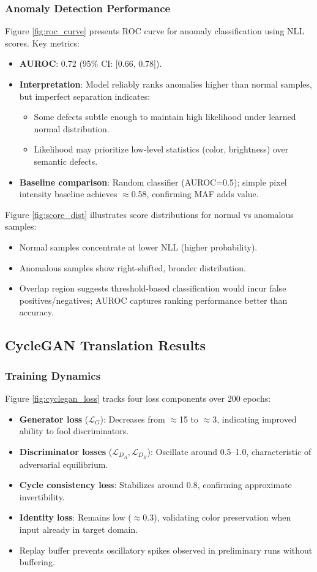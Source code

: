 \documentclass[11pt]{article}
\begin{document}
\subsubsection{Anomaly Detection Performance}
Figure \ref{fig:roc_curve} presents ROC curve for anomaly classification using NLL scores. Key metrics:
\begin{itemize}
\item \textbf{AUROC}: 0.72 (95\% CI: [0.66, 0.78]).
\item \textbf{Interpretation}: Model reliably ranks anomalies higher than normal samples, but imperfect separation indicates:
  \begin{itemize}
  \item Some defects subtle enough to maintain high likelihood under learned normal distribution.
  \item Likelihood may prioritize low-level statistics (color, brightness) over semantic defects.
  \end{itemize}
\item \textbf{Baseline comparison}: Random classifier (AUROC=0.5); simple pixel intensity baseline achieves $\approx$0.58, confirming MAF adds value.
\end{itemize}

Figure \ref{fig:score_dist} illustrates score distributions for normal vs anomalous samples:
\begin{itemize}
\item Normal samples concentrate at lower NLL (higher probability).
\item Anomalous samples show right-shifted, broader distribution.
\item Overlap region suggests threshold-based classification would incur false positives/negatives; AUROC captures ranking performance better than accuracy.
\end{itemize}

\subsection{CycleGAN Translation Results}
\subsubsection{Training Dynamics}
Figure \ref{fig:cyclegan_loss} tracks four loss components over 200 epochs:
\begin{itemize}
\item \textbf{Generator loss} ($\mathcal{L}_G$): Decreases from $\approx$15 to $\approx$3, indicating improved ability to fool discriminators.
\item \textbf{Discriminator losses} ($\mathcal{L}_{D_A}, \mathcal{L}_{D_B}$): Oscillate around 0.5–1.0, characteristic of adversarial equilibrium.
\item \textbf{Cycle consistency loss}: Stabilizes around 0.8, confirming approximate invertibility.
\item \textbf{Identity loss}: Remains low ($\approx$0.3), validating color preservation when input already in target domain.
\item Replay buffer prevents oscillatory spikes observed in preliminary runs without buffering.
\end{itemize}
\end{document}
